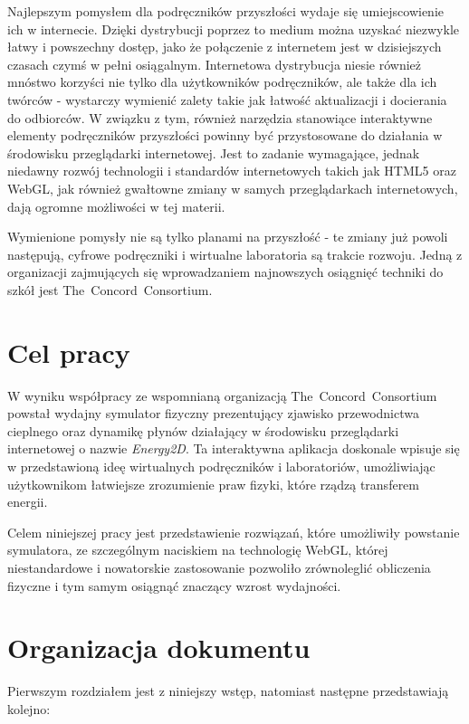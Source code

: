 Najlepszym pomysłem dla podręczników przyszłości wydaje się umiejscowienie ich w internecie. Dzięki
dystrybucji poprzez to medium można uzyskać niezwykle łatwy i powszechny dostęp, jako że połączenie
z internetem jest w dzisiejszych czasach czymś w pełni osiągalnym. Internetowa dystrybucja niesie
również mnóstwo korzyści nie tylko dla użytkowników podręczników, ale także dla ich twórców -
wystarczy wymienić zalety takie jak łatwość aktualizacji i docierania do odbiorców. W związku z tym,
również narzędzia stanowiące interaktywne elementy podręczników przyszłości powinny być
przystosowane do działania w środowisku przeglądarki internetowej. Jest to zadanie wymagające,
jednak niedawny rozwój technologii i standardów internetowych takich jak HTML5 oraz WebGL, jak
również gwałtowne zmiany w samych przeglądarkach internetowych, dają ogromne możliwości w tej
materii.

Wymienione pomysły nie są tylko planami na przyszłość - te zmiany już powoli następują, cyfrowe
podręczniki i wirtualne laboratoria są trakcie rozwoju. Jedną z organizacji zajmujących się
wprowadzaniem najnowszych osiągnięć techniki do szkół jest \mbox{The Concord Consortium}. 

\section{Cel pracy}
\label{sec:celPracy}

W wyniku współpracy ze wspomnianą organizacją \mbox{The Concord Consortium} powstał wydajny
symulator fizyczny prezentujący zjawisko przewodnictwa cieplnego oraz dynamikę płynów działający w
środowisku przeglądarki internetowej o nazwie \emph{\mbox{Energy2D}}. Ta interaktywna aplikacja
doskonale wpisuje się w przedstawioną ideę wirtualnych podręczników i laboratoriów, umożliwiając
użytkownikom łatwiejsze zrozumienie praw fizyki, które rządzą transferem energii.

Celem niniejszej pracy jest przedstawienie rozwiązań, które umożliwiły powstanie symulatora, ze
szczególnym naciskiem na technologię WebGL, której niestandardowe i nowatorskie zastosowanie
pozwoliło zrównoleglić obliczenia fizyczne i tym samym osiągnąć znaczący wzrost wydajności.

\section{Organizacja dokumentu}
\label{sec:organizacjaDokumentu}

Pierwszym rozdziałem jest z niniejszy wstęp, natomiast następne przedstawiają kolejno:

